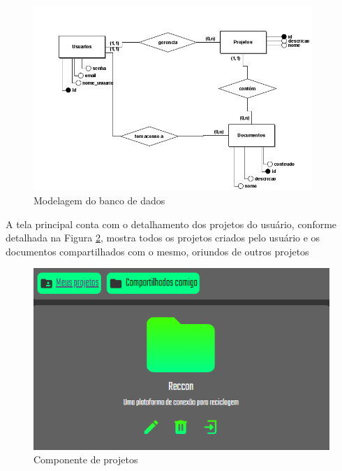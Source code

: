 \begin{figure}[H]
	\centering
	\includegraphics[width=300pt]{img/er-model.png}
	\caption{Modelagem do banco de dados}
	\label{fig:erModel}
\end{figure}



A tela principal conta com o detalhamento dos projetos do usuário, conforme detalhada na Figura \ref{fig:app}, mostra todos os projetos criados pelo usuário e os documentos compartilhados com o mesmo, oriundos de outros projetos

\begin{figure}[H]
	\centering
	\includegraphics[width=350pt]{img/app.png}
	\caption{Componente de projetos}
	\label{fig:app}
\end{figure}

